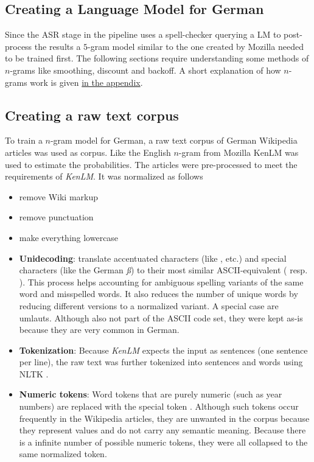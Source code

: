 \subsection{Creating a Language Model for German}

Since the \ac{ASR} stage in the pipeline uses a spell-checker querying a \ac{LM} to post-process the results a $5$-gram model similar to the one created by Mozilla needed to be trained first. The following sections require understanding some methods of $n$-grams like smoothing, discount and backoff. A short explanation of how $n$-grams work is given \hyperref[n-gram-summary]{in the appendix}.

\subsection{Creating a raw text corpus}

To train a $n$-gram model for German, a raw text corpus of German Wikipedia articles was used as corpus. Like the English $n$-gram from Mozilla KenLM \parencite{kenlm} was used to estimate the probabilities. The articles were pre-processed to meet the requirements of \textit{KenLM}. It was normalized as follows 

\begin{itemize}
	\item remove Wiki markup
	\item remove punctuation
	\item make everything lowercase
	\item \textbf{Unidecoding}: translate accentuated characters (like , etc.) and special characters (like the German \textit{ß}) to their most similar ASCII-equivalent ( resp. ). This process helps accounting for ambiguous spelling variants of the same word and misspelled words. It also reduces the number of unique words by reducing different versions to a normalized variant. A special case are umlauts. Although also not part of the ASCII code set, they were kept as-is because they are very common in German.
	\item \textbf{Tokenization}: Because \textit{KenLM} expects the input as sentences (one sentence per line), the raw text was further tokenized into sentences and words using NLTK \parencite{nltk}. 
	\item \textbf{Numeric tokens}: Word tokens that are purely numeric (such as year numbers) are replaced with the special token . Although such tokens occur frequently in the Wikipedia articles, they are unwanted in the corpus because they represent values and do not carry any semantic meaning. Because there is a infinite number of possible numeric tokens, they were all collapsed to the same normalized token.
\end{itemize}

